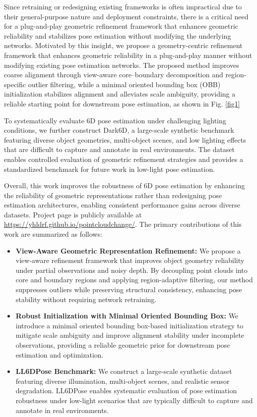 \documentclass[letterpaper, 10 pt, journal, twoside]{IEEEtran}  %
\begin{document}
Since retraining or redesigning existing frameworks is often impractical due to their general-purpose nature and deployment constraints, there is a critical need for a plug-and-play geometric refinement framework that enhances geometric reliability and stabilizes pose estimation without modifying the underlying networks. Motivated by this insight, we propose a geometry-centric refinement framework that enhances geometric reliability in a plug-and-play manner without modifying existing pose estimation networks. The proposed method improves coarse alignment through view-aware core–boundary decomposition and region-specific outlier filtering, while a minimal oriented bounding box (OBB) initialization stabilizes alignment and alleviates scale ambiguity, providing a reliable starting point for downstream pose estimation, as shown in Fig. \ref{fig1}


To systematically evaluate 6D pose estimation under challenging lighting conditions, we further construct Dark6D, a large-scale synthetic benchmark featuring diverse object geometries, multi-object scenes, and low lighting  effects that are difficult to capture and annotate in real environments. The dataset enables controlled evaluation of geometric refinement strategies and provides a standardized benchmark for future work in low-light pose estimation.

Overall, this work improves the robustness of 6D pose estimation by enhancing the reliability of geometric representations rather than redesigning pose estimation architectures, enabling consistent performance gains across diverse datasets. Project page is publicly available at \url{https://yhldrf.github.io/pointcloudchange/}. The primary contributions of this work are summarized as follows:


\begin{itemize}\itemsep0pt
	\item \textbf{View-Aware Geometric Representation Refinement:}  	We propose a view-aware refinement framework that improves object geometry reliability under partial observations and noisy depth. By decoupling point clouds into core and boundary regions and applying region-adaptive filtering, our method suppresses outliers while preserving structural consistency, enhancing pose stability without requiring network retraining.
	\item \textbf{Robust Initialization with Minimal Oriented Bounding Box:}  We introduce a minimal oriented bounding box-based initialization strategy to mitigate scale ambiguity and improve alignment stability under incomplete observations, providing a reliable geometric prior for downstream pose estimation and optimization.
	
	\item \textbf{LL6DPose Benchmark:}  	We construct a large-scale synthetic dataset featuring diverse illumination, multi-object scenes, and realistic sensor degradation. LL6DPose enables systematic evaluation of pose estimation robustness under low-light scenarios that are typically difficult to capture and annotate in real environments.
\end{itemize}
\end{document}

